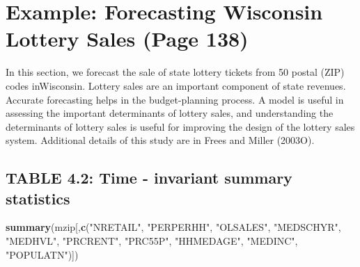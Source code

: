 \documentclass[]{book}
\newenvironment{Shaded}{\begin{snugshade}}{\end{snugshade}}
\newcommand{\CommentTok}[1]{\textcolor[rgb]{0.56,0.35,0.01}{\textit{#1}}}
\newcommand{\ControlFlowTok}[1]{\textcolor[rgb]{0.13,0.29,0.53}{\textbf{#1}}}
\newcommand{\KeywordTok}[1]{\textcolor[rgb]{0.13,0.29,0.53}{\textbf{#1}}}
\newcommand{\NormalTok}[1]{#1}
\newcommand{\OperatorTok}[1]{\textcolor[rgb]{0.81,0.36,0.00}{\textbf{#1}}}
\newcommand{\StringTok}[1]{\textcolor[rgb]{0.31,0.60,0.02}{#1}}
\begin{document}
\begin{Shaded}
\end{Shaded}

\hypertarget{example-forecasting-wisconsin-lottery-sales-page-138}{%
\section{Example: Forecasting Wisconsin Lottery Sales (Page 138)}\label{example-forecasting-wisconsin-lottery-sales-page-138}}

In this section, we forecast the sale of state lottery tickets from 50 postal (ZIP) codes inWisconsin. Lottery sales are an important component of state revenues. Accurate forecasting helps in the budget-planning process. A model is useful in assessing the important determinants of lottery sales, and understanding the determinants of lottery sales is useful for improving the design of the lottery sales system. Additional details of this study are in Frees and Miller (2003O).

\hypertarget{table-4.2-time---invariant-summary-statistics}{%
\subsection{TABLE 4.2: Time - invariant summary statistics}\label{table-4.2-time---invariant-summary-statistics}}

\begin{Shaded}
\begin{Highlighting}[]
\KeywordTok{summary}\NormalTok{(mzip[,}\KeywordTok{c}\NormalTok{(}\StringTok{"NRETAIL"}\NormalTok{, }\StringTok{"PERPERHH"}\NormalTok{, }\StringTok{"OLSALES"}\NormalTok{, }\StringTok{"MEDSCHYR"}\NormalTok{, }\StringTok{"MEDHVL"}\NormalTok{, }\StringTok{"PRCRENT"}\NormalTok{, }\StringTok{"PRC55P"}\NormalTok{, }\StringTok{"HHMEDAGE"}\NormalTok{, }\StringTok{"MEDINC"}\NormalTok{, }\StringTok{"POPULATN"}\NormalTok{)]) }
\end{Highlighting}
\end{Shaded}
\end{document}
